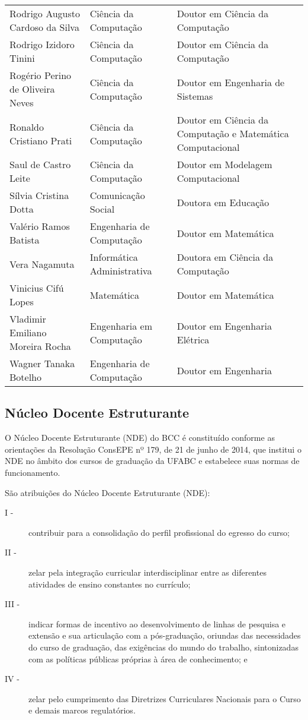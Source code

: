 {\begin{longtable}{|p{}|p{}|p{}|}
    Rodrigo Augusto Cardoso da Silva & Ciência da Computação & Doutor em Ciência da Computação \\
    Rodrigo Izidoro Tinini & Ciência da Computação & Doutor em Ciência da Computação \\
    Rogério Perino de Oliveira Neves & Ciência da Computação & Doutor em Engenharia de Sistemas\\
    Ronaldo Cristiano Prati & Ciência da Computação & Doutor em Ciência da Computação e Matemática Computacional \\
    Saul de Castro Leite & Ciência da Computação & Doutor em Modelagem Computacional \\
    Sílvia Cristina Dotta & Comunicação Social & Doutora em Educação \\
    Valério Ramos Batista & Engenharia de Computação & Doutor em Matemática \\
    Vera Nagamuta & Informática Administrativa & Doutora em Ciência da Computação \\
    Vinicius Cifú Lopes & Matemática & Doutor em Matemática \\
    Vladimir Emiliano Moreira Rocha & Engenharia em Computação & Doutor em Engenharia Elétrica \\
    Wagner Tanaka Botelho & Engenharia de Computação & Doutor em Engenharia \\
    \hline
\end{longtable}
}


\subsection{Núcleo Docente Estruturante}

O Núcleo Docente Estruturante (NDE) do BCC é constituído conforme as
orientações da Resolução ConsEPE nº 179, de 21 de junho de 2014, que institui o
NDE no âmbito dos cursos de graduação da UFABC e estabelece suas normas de
funcionamento. 

São atribuições do Núcleo Docente Estruturante (NDE):
\begin{description}
    \item[I -] contribuir para a consolidação do perfil profissional do egresso
    do curso;
    \item[II -] zelar pela integração curricular interdisciplinar entre as
    diferentes atividades de ensino constantes no currículo;
    \item[III -] indicar formas de incentivo ao desenvolvimento de linhas de
    pesquisa e extensão e sua articulação com a pós-graduação, oriundas das
    necessidades do curso de graduação, das exigências do mundo do trabalho,
    sintonizadas com as políticas públicas próprias à área de conhecimento; e
    \item[IV -] zelar pelo cumprimento das Diretrizes Curriculares Nacionais
    para o Curso e demais marcos regulatórios.
\end{description}

